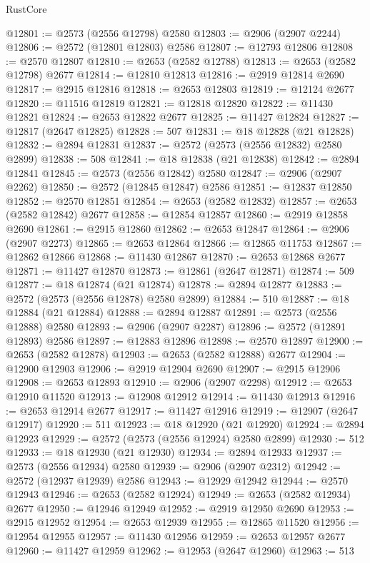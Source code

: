 \begin{lexlean}{RustCore}
\begin{coremodule}
@12801 := @2573 (@2556 @12798) @2580
@12803 := @2906 (@2907 @2244)
@12806 := @2572 (@12801 @12803) @2586
@12807 := @12793 @12806
@12808 := @2570 @12807
@12810 := @2653 (@2582 @12788)
@12813 := @2653 (@2582 @12798) @2677
@12814 := @12810 @12813
@12816 := @2919 @12814 @2690
@12817 := @2915 @12816
@12818 := @2653 @12803
@12819 := @12124 @2677
@12820 := @11516 @12819
@12821 := @12818 @12820
@12822 := @11430 @12821
@12824 := @2653 @12822 @2677
@12825 := @11427 @12824
@12827 := @12817 (@2647 @12825)
@12828 := 507
@12831 := @18 @12828 (@21 @12828)
@12832 := @2894 @12831
@12837 := @2572 (@2573 (@2556 @12832) @2580 @2899)
@12838 := 508
@12841 := @18 @12838 (@21 @12838)
@12842 := @2894 @12841
@12845 := @2573 (@2556 @12842) @2580
@12847 := @2906 (@2907 @2262)
@12850 := @2572 (@12845 @12847) @2586
@12851 := @12837 @12850
@12852 := @2570 @12851
@12854 := @2653 (@2582 @12832)
@12857 := @2653 (@2582 @12842) @2677
@12858 := @12854 @12857
@12860 := @2919 @12858 @2690
@12861 := @2915 @12860
@12862 := @2653 @12847
@12864 := @2906 (@2907 @2273)
@12865 := @2653 @12864
@12866 := @12865 @11753
@12867 := @12862 @12866
@12868 := @11430 @12867
@12870 := @2653 @12868 @2677
@12871 := @11427 @12870
@12873 := @12861 (@2647 @12871)
@12874 := 509
@12877 := @18 @12874 (@21 @12874)
@12878 := @2894 @12877
@12883 := @2572 (@2573 (@2556 @12878) @2580 @2899)
@12884 := 510
@12887 := @18 @12884 (@21 @12884)
@12888 := @2894 @12887
@12891 := @2573 (@2556 @12888) @2580
@12893 := @2906 (@2907 @2287)
@12896 := @2572 (@12891 @12893) @2586
@12897 := @12883 @12896
@12898 := @2570 @12897
@12900 := @2653 (@2582 @12878)
@12903 := @2653 (@2582 @12888) @2677
@12904 := @12900 @12903
@12906 := @2919 @12904 @2690
@12907 := @2915 @12906
@12908 := @2653 @12893
@12910 := @2906 (@2907 @2298)
@12912 := @2653 @12910 @11520
@12913 := @12908 @12912
@12914 := @11430 @12913
@12916 := @2653 @12914 @2677
@12917 := @11427 @12916
@12919 := @12907 (@2647 @12917)
@12920 := 511
@12923 := @18 @12920 (@21 @12920)
@12924 := @2894 @12923
@12929 := @2572 (@2573 (@2556 @12924) @2580 @2899)
@12930 := 512
@12933 := @18 @12930 (@21 @12930)
@12934 := @2894 @12933
@12937 := @2573 (@2556 @12934) @2580
@12939 := @2906 (@2907 @2312)
@12942 := @2572 (@12937 @12939) @2586
@12943 := @12929 @12942
@12944 := @2570 @12943
@12946 := @2653 (@2582 @12924)
@12949 := @2653 (@2582 @12934) @2677
@12950 := @12946 @12949
@12952 := @2919 @12950 @2690
@12953 := @2915 @12952
@12954 := @2653 @12939
@12955 := @12865 @11520
@12956 := @12954 @12955
@12957 := @11430 @12956
@12959 := @2653 @12957 @2677
@12960 := @11427 @12959
@12962 := @12953 (@2647 @12960)
@12963 := 513

\end{coremodule}
\end{lexlean}

